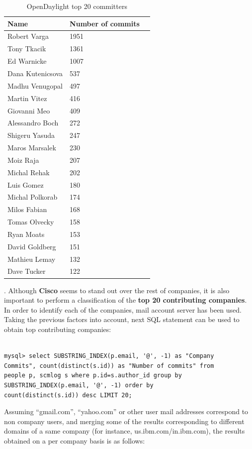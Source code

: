 \documentclass[a4paper, 12pt]{book}
\begin{document}
\begin{table}[H]
\footnotesize
\begin{center}
\begin{tabular}{|l|l|p{3cm}|}
\hline
\textbf{Name}     & \textbf{Number of commits} \\ \hline
 Robert Varga     & 1951 \\ \hline
 Tony Tkacik      & 1361 \\ \hline
 Ed Warnicke      & 1007 \\ \hline
 Dana Kutenicsova &  537 \\ \hline
 Madhu Venugopal  &  497 \\ \hline
 Martin Vitez     &  416 \\ \hline
 Giovanni Meo     &  409 \\ \hline
 Alessandro Boch  &  272 \\ \hline
 Shigeru Yasuda   &  247 \\ \hline
 Maros Marsalek   &  230 \\ \hline
 Moiz Raja        &  207 \\ \hline
 Michal Rehak     &  202 \\ \hline
 Luis Gomez       &  180 \\ \hline
 Michal Polkorab  &  174 \\ \hline
 Milos Fabian     &  168 \\ \hline
 Tomas Olvecky    &  158 \\ \hline
 Ryan Moats       &  153 \\ \hline
 David Goldberg   &  151 \\ \hline
 Mathieu Lemay    &  132 \\ \hline
 Dave Tucker      &  122 \\ \hline
\end{tabular}
\end{center}
\caption{OpenDaylight top 20 committers}
\label{tab:odl_top_committers}
\end{table}
. Although \textbf{Cisco} seems to stand out over the rest of companies, it is also important to perform a classification of the \textbf{top 20 contributing companies}. In order to identify each of the companies, mail account server has been used. Taking the previous factors into account, next SQL statement can be used to obtain top contributing companies:

\begin{verbatim}

mysql> select SUBSTRING_INDEX(p.email, '@', -1) as "Company
Commits", count(distinct(s.id)) as "Number of commits" from
people p, scmlog s where p.id=s.author_id group by
SUBSTRING_INDEX(p.email, '@', -1) order by
count(distinct(s.id)) desc LIMIT 20;

\end{verbatim}
Assuming ``gmail.com'', ``yahoo.com'' or other user mail addresses correspond to non company users, and merging some of the results corresponding to different domains of a same company (for instance, us.ibm.com/in.ibm.com), the results obtained on a per company basis is as follows:
\end{document}
